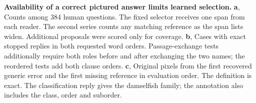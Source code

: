 \textbf{Availability of a correct pictured answer limits learned selection.}
\textbf{a}, Counts among 384 human questions. The fixed selector receives one span from each reader. The second series counts any matching reference as the span lists widen. Additional proposals were scored only for coverage.
\textbf{b}, Cases with exact stopped replies in both requested word orders. Passage-exchange tests additionally require both roles before and after exchanging the two names; the reordered tests add both clause orders.
\textbf{c}, Original pixels from the first recovered generic error and the first missing reference in evaluation order. The definition is exact. The classification reply gives the damselfish family; the annotation also includes the class, order and suborder.

